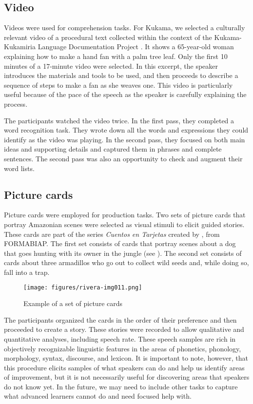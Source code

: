 \documentclass[output=paper]{langscibook}
\begin{document}
\subsection{{{Video}}}\label{sec:7:4.1}

Videos were used for comprehension tasks. For Kukama, we selected a culturally relevant video of a procedural text collected within the context of the Kukama-Kukamiria Language Documentation Project \citep{Vallejos2014}. It shows a 65-year-old woman explaining how to make a hand fan with a palm tree leaf. Only the first 10 minutes of a 17-minute video were selected. In this excerpt, the speaker introduces the materials and tools to be used, and then proceeds to describe a sequence of steps to make a fan as she weaves one. This video is particularly useful because of the pace of the speech as the speaker is carefully explaining the process.

The participants watched the video twice. In the first pass, they completed a word recognition task. They wrote down all the words and expressions they could identify as the video was playing. In the second pass, they focused on both main ideas and supporting details and captured them in phrases and complete sentences. The second pass was also an opportunity to check and augment their word lists.

\subsection{{{Picture cards}}}

Picture cards were employed for production tasks. Two sets of picture cards that portray Amazonian scenes were selected as visual stimuli to elicit guided stories. These cards are part of the series \textit{Cuentos en Tarjetas} created by \citet{AmíasEtAl2003}, from FORMABIAP. The first set consists of cards that portray scenes about a dog that goes hunting with its owner in the jungle (see ). The second set consists of cards about three armadillos who go out to collect wild seeds and, while doing so, fall into a trap.

\begin{figure}
\caption{Example of a set of picture cards \citep{AmíasEtAl2003}}
\label{fig:7:1}
\texttt{[image: figures/rivera-img011.png]}
\end{figure}


The participants organized the cards in the order of their preference and then proceeded to create a story. These stories were recorded to allow qualitative and quantitative analyses, including speech rate. These speech samples are rich in objectively recognizable linguistic features in the areas of phonetics, phonology, morphology, syntax, discourse, and lexicon. It is important to note, however, that this procedure elicits samples of what speakers can do and help us identify areas of improvement, but it is not necessarily useful for discovering areas that speakers do not know yet. In the future, we may need to include other tasks to capture what advanced learners cannot do and need focused help with.
\end{document}
